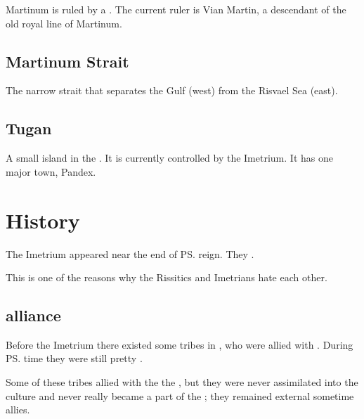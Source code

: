 Martinum is ruled by a .
The current ruler is Vian Martin, a descendant of the old royal line of Martinum. 





\subsection{Martinum Strait}
The narrow strait that separates the \Samure{} Gulf (west) from the Risvael Sea (east). 





\subsection{Tugan}
A small island in the \Risvaelsea. It is currently controlled by the Imetrium. It has one major town, Pandex. 















\section{History}
The Imetrium appeared near the end of \ps{\Ortaica}{} reign. 
They . 

This is one of the reasons why the Rissitics and Imetrians hate each other. 









\subsection[Nycaneer alliance]{\Nycaneer{} alliance}
Before the Imetrium there existed some \nycaneer{} tribes in \Ortaica, who were allied with \nycans. 
During \ps{\Ortaica} time they were still pretty \Wylde{}. 

Some of these tribes allied with the the \Ortaicans, but they were never assimilated into the \Ortaican{} culture and never really became a part of the \bacconate; they remained external sometime allies. 

